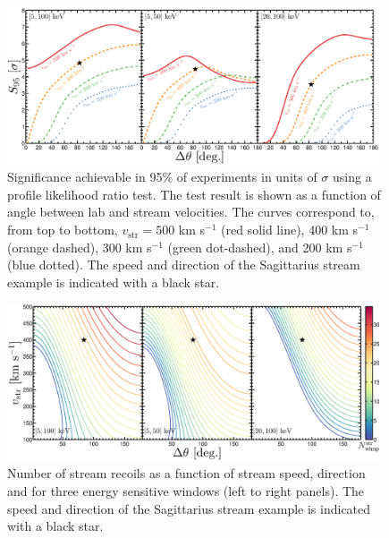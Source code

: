 \begin{figure}
  \centering
  \includegraphics[trim = 0mm 0 0mm 0mm, clip, width=0.98\textwidth]{Figures/S95_DeltaTheta.eps}
  \caption[Profile likelihood test significance as a function of stream angle]{Significance achievable in 95\% of experiments in units of $\sigma$ using a profile likelihood ratio test. The test result is shown as a function of angle between lab and stream velocities. The curves correspond to, from top to bottom, $v_\textrm{str} = 500$ km s$^{-1}$ (red solid line), 400 km s$^{-1}$ (orange dashed), 300 km s$^{-1}$ (green dot-dashed), and 200 km s$^{-1}$ (blue dotted). The speed and direction of the Sagittarius stream example is indicated with a black star.}
  \label{fig:S95_DeltaTheta}
\end{figure}
\begin{figure}
  \centering
  \includegraphics[trim = 0mm 0 0mm 0mm, clip, width=0.98\textwidth]{Figures/N_wimp_str_location_cont.eps}
  \caption[Number of stream recoils as a function of stream velocity]{Number of stream recoils as a function of stream speed, direction and for three energy sensitive windows (left to right panels). The speed and direction of the Sagittarius stream example is indicated with a black star.}
  \label{fig:N_wimp_str_location_cont}
\end{figure}
